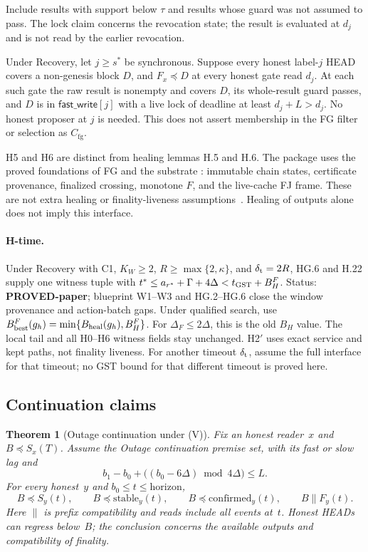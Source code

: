 \documentclass{article}
\theoremstyle{plain}
\newtheorem{theorem}{Theorem}
\theoremstyle{definition}
\theoremstyle{remark}
\newcommand{\Cfg}{C_{\mathrm{fg}}}
\newcommand{\fastWrite}{\mathsf{fast\_write}}
\begin{document}
\begin{description}[leftmargin=1.5em]
  Include results with support below $\tau$ and results whose guard
  was not assumed to pass.  The lock claim concerns the revocation
  state; the result is evaluated at $d_j$ and is not read by the
  earlier revocation.
\item[H6: unanimous gate service.]  Under Recovery, let $j\geq s^*$ be synchronous.  Suppose
  every honest label-$j$ HEAD covers a non-genesis block $D$, and
  $F_x\preceq D$ at every honest gate read $d_j$.  At each such gate
  the raw result is nonempty and covers $D$, its whole-result guard
  passes, and $D$ is in $\fastWrite[j]$ with a live lock of deadline
  at least $d_j+L>d_j$.  No honest proposer at $j$ is needed.
  This does not assert membership in the FG filter or selection as
  $\Cfg$.
\end{description}
H5 and H6 are distinct from healing lemmas H.5 and H.6.
The package uses the proved foundations of FG and the substrate
\cite[IF.1--IF.4, W1--W3]{BPH}:
immutable chain states, certificate provenance, finalized crossing,
monotone $F$, and the live-cache FJ frame.  These are not extra
healing or finality-liveness assumptions~\cite[H.22]{BPH}.
Healing of outputs alone does not imply this interface.
\paragraph{H-time.}
Under Recovery with C1, $K_W\geq2$, $R\geq\max\{2,\kappa\}$,
and $\delta_{\rm t}=2R$, HG.6 and H.22 supply one witness tuple with
$t^*\leq a_{r^*}+\Gamma+4\Delta<t_{\rm GST}+B_H^F$.
Status: \textbf{PROVED-paper}; blueprint W1--W3 and HG.2--HG.6 close
the window provenance and action-batch gaps. Under qualified search,
use $B_{\rm best}^F(g_h)=\min\{B_{\rm heal}(g_h),B_H^F\}$.
For $\Delta_F\leq2\Delta$, this is the old $B_H$ value. The local
tail and all H0--H6 witness fields stay unchanged. H2$'$ uses exact
service and kept paths, not finality liveness. For another timeout
$\delta_{\rm t}$, assume the full interface for that timeout; no GST
bound for that different timeout is proved here.

\subsection{Continuation claims}\label{sec:continuation-claims}

\begin{theorem}[Outage continuation under (V)]\label{thm:outage-continuation}
Fix an honest reader~$x$ and $B\preceq S_x(T)$.  Assume the Outage
continuation premise set, with its fast or slow lag and
\begin{equation}
 b_1-b_0+\bigl((b_0-6\Delta)\bmod 4\Delta\bigr)\leq L. \tag{V}
\end{equation}
For every honest~$y$ and $b_0\leq t\leq\mathrm{horizon}$,
\[
 B\preceq S_y(t),\qquad B\preceq\mathrm{stable}_y(t),\qquad
 B\preceq\mathrm{confirmed}_y(t),\qquad B\parallel F_y(t).
\]
Here $\parallel$ is prefix compatibility and reads include all events
at~$t$.  Honest HEADs can regress below~$B$; the conclusion concerns
the available outputs and compatibility of finality.
\end{theorem}
\end{document}

